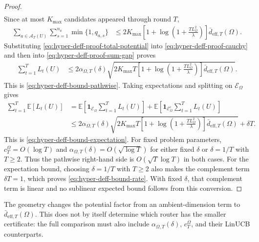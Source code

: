 \documentclass{article} %
\begin{document}
\begin{proof}
\begin{align}
\end{align}
Since at most \(K_{\max}\) candidates appeared through round \(T\),
\begin{align}
\label{eq:hyper-deff-proof-total-potential}
\sum_{a\in\mathcal A_T(U)}
\sum_{s=1}^{n_a}
\min\{1,q_{a,s}\}
&\le
2K_{\max}
\left[
1+\log\!\left(1+\frac{TL_{\Omega}^{2}}{\lambda}\right)
\right]
\bar d_{\mathrm{eff},T}(\Omega).
\end{align}
Substituting \eqref{eq:hyper-deff-proof-total-potential} into \eqref{eq:hyper-deff-proof-cauchy} and then into \eqref{eq:hyper-deff-proof-sum-gap} proves
\begin{align}
\label{eq:hyper-deff-proof-pathwise}
\sum_{t=1}^{T}L_t(U)
&\le
2\alpha_{\Omega,T}(\delta)
\sqrt{
2K_{\max}T
\left[
1+\log\!\left(1+\frac{TL_{\Omega}^{2}}{\lambda}\right)
\right]
\bar d_{\mathrm{eff},T}(\Omega)
}.
\end{align}
This is \eqref{eq:hyper-deff-bound-pathwise}.  Taking expectations and splitting on \(\mathcal{E}_{\Omega}\) gives
\begin{align}
\label{eq:hyper-deff-proof-expectation-split}
\sum_{t=1}^{T}\mathbb{E}[L_t(U)]
&=
\mathbb{E}
\!\left[
\mathbf{1}_{\mathcal{E}_{\Omega}}
\sum_{t=1}^{T}L_t(U)
\right]
+
\mathbb{E}
\!\left[
\mathbf{1}_{\mathcal{E}_{\Omega}^{c}}
\sum_{t=1}^{T}L_t(U)
\right]
\\
&\le
2\alpha_{\Omega,T}(\delta)
\sqrt{
2K_{\max}T
\left[
1+\log\!\left(1+\frac{TL_{\Omega}^{2}}{\lambda}\right)
\right]
\bar d_{\mathrm{eff},T}(\Omega)
}
+
\delta T .
\end{align}
This is \eqref{eq:hyper-deff-bound-expectation}. For fixed problem
parameters, \(c_T^\Omega=O(\log T)\) and
\(\alpha_{\Omega,T}(\delta)=O(\sqrt{\log T})\) for either fixed \(\delta\)
or \(\delta=1/T\) with \(T\ge2\). Thus the pathwise right-hand side is
\(O(\sqrt T\log T)\) in both cases. For the expectation bound, choosing
\(\delta=1/T\) with \(T\ge2\) also makes the complement term \(\delta T=1\), which proves
\eqref{eq:hyper-deff-bound-rate}. With fixed \(\delta\), that complement term
is linear and no sublinear expected bound follows from this conversion.
\end{proof}

The geometry changes the potential factor from an ambient-dimension term to
\(\bar d_{\mathrm{eff},T}(\Omega)\). This does not by itself determine which
router has the smaller certificate: the full comparison must also include
\(\alpha_{\Omega,T}(\delta)\), \(c_T^\Omega\), and their LinUCB counterparts.
\end{document}
